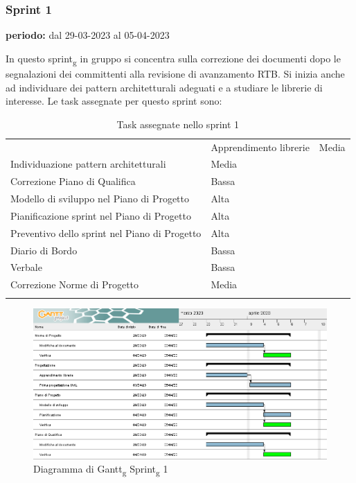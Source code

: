 \subsubsection{Sprint 1}
\begin{center}
\textbf{periodo:} dal 29-03-2023 al 05-04-2023\\
\end{center}
In questo sprint\textsubscript{g} in gruppo si concentra sulla correzione dei documenti dopo le segnalazioni dei committenti alla revisione di avanzamento RTB.
Si inizia anche ad individuare dei pattern architetturali adeguati e a studiare le librerie di interesse. Le task assegnate per questo sprint sono:
\begin{longtable}{ 
	>{\centering}M{0.30\textwidth} 
	>{\centering}M{0.10\textwidth}
	}
	\rowcolorhead
	\centering 
	 &	
	\endfirsthead	
	\endhead
	
	Apprendimento librerie & Media \tabularnewline
	Individuazione pattern architetturali & Media \tabularnewline
	Correzione Piano di Qualifica & Bassa \tabularnewline
	Modello di sviluppo nel Piano di Progetto & Alta \tabularnewline
	Pianificazione sprint nel Piano di Progetto & Alta \tabularnewline
	Preventivo dello sprint nel Piano di Progetto & Alta \tabularnewline
	Diario di Bordo & Bassa \tabularnewline
	Verbale & Bassa \tabularnewline
	Correzione Norme di Progetto & Media \tabularnewline
	\captionline \caption{Task assegnate nello sprint 1}
\end{longtable}


\begin{figure}[H]
    \centering
    \includegraphics[scale=0.56]{image/gantt_sprint1.PNG}
    \caption{Diagramma di Gantt\textsubscript{g} Sprint\textsubscript{g} 1}
\end{figure}

